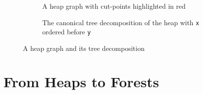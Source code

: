 \begin{figure}[t]
\begin{center}

  \begin{subfigure}[b]{0.46\linewidth}
  \begin{center}
    
  \end{center}
  \caption{A heap graph with cut-points highlighted in red}
  \label{fig:decomp_a}
  \end{subfigure}
  \hfill
  \begin{subfigure}[b]{0.46\linewidth}
  \begin{center}
    
    \vspace{-4mm}
  \end{center}
  \caption{The canonical
  tree decomposition of the heap with \texttt{x} ordered before \texttt{y}}
  \label{fig:decomp_b}
  \end{subfigure}

  \caption{A heap graph and its tree decomposition}

  \label{figDecomposition}

\end{center}
\end{figure}


\section{From Heaps to Forests}\label{sec:heaps2forests}

